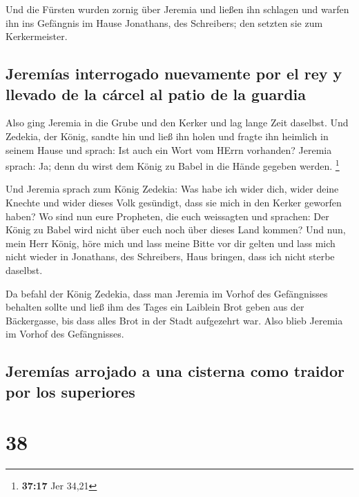  Und die Fürsten wurden zornig über Jeremia und ließen
ihn schlagen und warfen ihn ins Gefängnis im Hause Jonathans, des
Schreibers; den setzten sie zum Kerkermeister.

\hypertarget{jeremuxedas-interrogado-nuevamente-por-el-rey-y-llevado-de-la-cuxe1rcel-al-patio-de-la-guardia}{%
\subsection{Jeremías interrogado nuevamente por el rey y llevado de la
cárcel al patio de la
guardia}\label{jeremuxedas-interrogado-nuevamente-por-el-rey-y-llevado-de-la-cuxe1rcel-al-patio-de-la-guardia}}

 Also ging Jeremia in die Grube und den Kerker und lag
lange Zeit daselbst.  Und Zedekia, der König, sandte hin
und ließ ihn holen und fragte ihn heimlich in seinem Hause und sprach:
Ist auch ein Wort vom HErrn vorhanden? Jeremia sprach: Ja; denn du wirst
dem König zu Babel in die Hände gegeben werden. \footnote{\textbf{37:17}
  Jer 34,21}

 Und Jeremia sprach zum König Zedekia: Was habe ich wider
dich, wider deine Knechte und wider dieses Volk gesündigt, dass sie mich
in den Kerker geworfen haben?  Wo sind nun eure
Propheten, die euch weissagten und sprachen: Der König zu Babel wird
nicht über euch noch über dieses Land kommen?  Und nun,
mein Herr König, höre mich und lass meine Bitte vor dir gelten und lass
mich nicht wieder in Jonathans, des Schreibers, Haus bringen, dass ich
nicht sterbe daselbst.

 Da befahl der König Zedekia, dass man Jeremia im Vorhof
des Gefängnisses behalten sollte und ließ ihm des Tages ein Laiblein
Brot geben aus der Bäckergasse, bis dass alles Brot in der Stadt
aufgezehrt war. Also blieb Jeremia im Vorhof des Gefängnisses.

\hypertarget{jeremuxedas-arrojado-a-una-cisterna-como-traidor-por-los-superiores}{%
\subsection{Jeremías arrojado a una cisterna como traidor por los
superiores}\label{jeremuxedas-arrojado-a-una-cisterna-como-traidor-por-los-superiores}}

\hypertarget{section-37}{%
\section{38}\label{section-37}}

